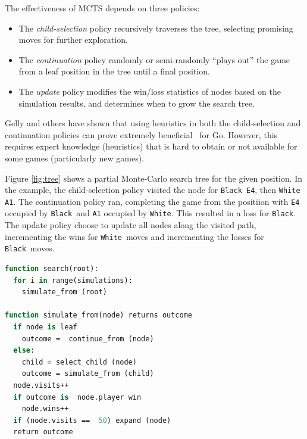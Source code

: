 \documentclass{acm_proc_article-sp}
\newcommand{\hblack}{\texttt{Black}}
\newcommand{\hwhite}{\texttt{White}}
\begin{document}
The effectiveness of MCTS depends on three policies:
\begin{itemize}
\item{The \emph{child-selection} policy recursively traverses the tree, selecting promising moves for further exploration.}
\item{The \emph{continuation} policy randomly or semi-randomly ``plays out'' the game from a leaf position in the tree until a final position.}
\item{The \emph{update} policy modifies the win/loss statistics of nodes based on the simulation results, and determines when to grow the search tree.}
\end{itemize}

Gelly and others have shown that using heuristics in both the child-selection and continuation policies 
can prove extremely beneficial~\cite{gelly2006modification,gelly2008achieving} for Go.
However, this requires expert knowledge (heuristics) that is hard to obtain or not available for some games (particularly new games). 

Figure \ref{fig:tree} shows a partial Monte-Carlo search tree for the given position. In the example, the child-selection policy visited the node for \texttt{Black E4}, then \texttt{White A1}. 
The continuation policy ran, completing the game from the positiion with \texttt{E4} occupied by \hblack\ and \texttt{A1} occupied by \hwhite.
This resulted in a loss for \hblack. 
The update policy choose to update all nodes along the visited path, incrementing the wins for \hwhite\ moves and incrementing the losses for \hblack\ moves.

\begin{lstlisting}[float,frame=single,language=Pascal,caption=MCTS Algorithm Pseudocode]
function search(root):
  for i in range(simulations):
    simulate_from (root)

function simulate_from(node) returns outcome
  if node is leaf
    outcome =  continue_from (node)
  else:
    child = select_child (node)
    outcome = simulate_from (child)
  node.visits++
  if outcome is  node.player win
    node.wins++
  if (node.visits ==  50) expand (node)
  return outcome
\end{lstlisting}
\end{document}
